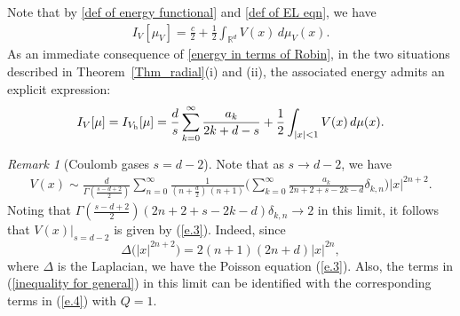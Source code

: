 \documentclass[10pt]{amsart}
\def\R{\mathbb{R}}
\theoremstyle{plain}
\theoremstyle{remark}
\newtheorem{rem}{Remark}
\numberwithin{equation}{section}
\begin{document}
Note that by \eqref{def of energy functional} and \eqref{def of EL eqn}, we have  
\begin{align} \label{energy in terms of Robin}
I_{V}[ \mu_V ]  = \frac{c}{2} +\frac12 \int_{ \R^d } V(x)\,d\mu_V(x). 
\end{align}
As an immediate consequence of \eqref{energy in terms of Robin}, in the two situations described in Theorem~\ref{Thm_radial}(i) and (ii), the associated energy admits an explicit expression: 
\begin{align}
 \label{energy in main result}
I_V[\mu]= I_{V_{ \rm h }}[\mu]  = \frac{ d }{ s }    \sum_{k=0}^\infty \frac{a_k}{ 2k+d-s } +\frac12 \int_{ |x|<1 } V(x)\,d\mu(x). 
\end{align}  
 


\begin{rem}[Coulomb gases $s=d-2$]
Note that as $s \to d-2$, we have
\begin{align*}
V(x) \sim \frac{ d }{ \Gamma( \frac{s-d+2}{2} )  }   \sum_{n=0}^\infty \frac{ 1 }{ (n+\frac{d}{2}) \, (n+1) } \bigg( \sum_{k=0}^\infty \frac{ a_k}{ 2n+2+s-2k-d } \delta_{k,n} \bigg) |x|^{2n+2} . 
\end{align*}
Noting that $\Gamma( \frac{s-d+2}{2} ) (2n+2+s-2k-d)  \delta_{k,n} \to 2$ in this limit, it follows that $V(x)|_{s=d-2}$ is given by (\ref{e.3}).
Indeed, since 
$$
\Delta \Big( |x|^{2n+2} \Big) = 2(n+1)(2n+d) |x|^{2n}, 
$$
where $\Delta$ is the Laplacian, we have the Poisson equation (\ref{e.3}).
Also, the terms in (\ref{inequality for general}) in this limit can be identified with the corresponding terms in (\ref{e.4}) with $Q=1$.  
\end{rem}

 
\end{document}
